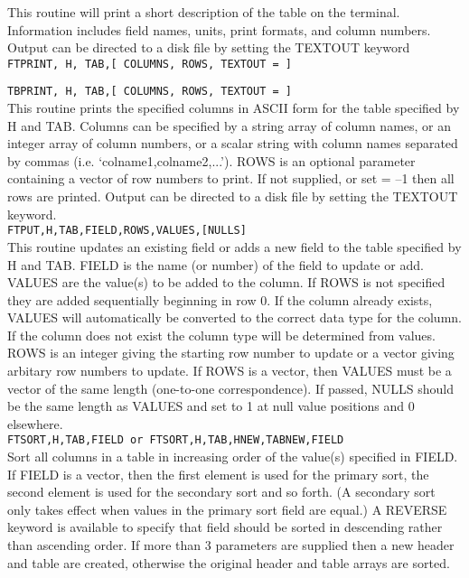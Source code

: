 	This routine will print a short description of the table
	on the terminal.  Information includes field names, units,
        print formats, and column numbers. Output can be directed 
        to a disk file by setting the TEXTOUT keyword  \\

{\tt FTPRINT, H, TAB,[ COLUMNS, ROWS, TEXTOUT = ]} 

{\tt TBPRINT, H, TAB,[ COLUMNS, ROWS, TEXTOUT = ]} \\

	This routine prints the specified columns in ASCII form
	for the table specified by H and TAB.  Columns can be
	specified by a string array of column names, or an integer
	array of column numbers, or a scalar string with column
	names separated by commas (i.e. `colname1,colname2,...').
	ROWS is an optional parameter containing a vector of row
	numbers to print.  If not supplied, or set = --1 then 
        all rows are printed.  Output can be directed to a disk
        file by setting the TEXTOUT keyword. \\

{\tt  FTPUT,H,TAB,FIELD,ROWS,VALUES,[NULLS]} \\
 
	This routine updates an existing field or adds a new
	field to the table specified by H and TAB.  FIELD
	is the name (or number) of the field to update or add.   
        VALUES are the value(s) to be added to the column.  If 
        ROWS is not specified they are added sequentially 
        beginning in row 0.  If the column already exists, VALUES 
        will automatically be converted to the correct data type 
        for the column.  If the column does not exist the column 
        type will be determined from values.  ROWS is an integer 
        giving the starting row number to update or a vector giving
	arbitary row numbers to update.  If ROWS is a vector, then
	VALUES must be a vector of the same length (one-to-one
	correspondence). If passed, NULLS should be the
        same length as VALUES and set to 1 at null value positions
        and 0 elsewhere. \\
 
{\tt FTSORT,H,TAB,FIELD or FTSORT,H,TAB,HNEW,TABNEW,FIELD} \\

        Sort all columns in a table in increasing order of the value(s)
        specified in FIELD.  If FIELD is a vector, then the first element is 
        used for the primary sort, the second element is used for the secondary
       sort and so forth.   (A secondary sort only takes effect when values in
        the primary sort field are equal.)    A REVERSE keyword is available to
       specify that field should be sorted in descending rather than ascending
        order.  If more than 3 parameters are supplied
        then a new header and table are created, otherwise the original
        header and table arrays are sorted. \\

